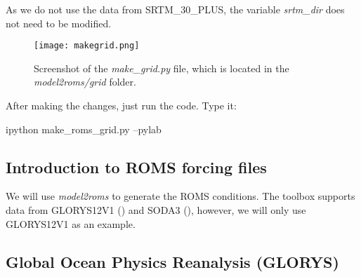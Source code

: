 \begin{tcolorbox}[enhanced,
    grow to left by   = 0cm,
    grow to right by  = 0cm,
    enlarge top by    = 0cm,
    enlarge bottom by = 0cm,
    tcbox raise base,
    boxrule           = 1.0pt,
    left              = 18mm,
    colframe          = yellow!50!black,coltext=yellow!25!black,colback=yellow!10!white,
    overlay           = {\begin{tcbclipinterior}\fill[yellow!75!blue!50!white] (frame.south west)
      rectangle node[text=white,font=\sffamily\bfseries\footnotesize,rotate=0] {ATTENTION} ([xshift=18mm]frame.north west);\end{tcbclipinterior}}]
As we do not use the data from SRTM\_30\_PLUS, the variable \textit{srtm\_dir} does not need to be modified.
\end{tcolorbox}
\bigskip

\begin{figure}[H]
    \centering
    \texttt{[image: makegrid.png]}
    \caption{Screenshot of the \textit{make\_grid.py} file, which is located in the \textit{model2roms/grid} folder.}
    \label{fazgrade}
\end{figure}
\bigskip

\noindent After making the changes, just run the code. Type it:
\bigskip

\begin{bashcode}
ipython make_roms_grid.py --pylab
\end{bashcode}
\bigskip

\subsection{Introduction to ROMS forcing files}
\bigskip

\noindent We will use \textit{model2roms} to generate the ROMS conditions. The toolbox supports data from GLORYS12V1 (\cite{Fernandez2018}) 
and SODA3 (\cite{Carton2018}), however, we will only use GLORYS12V1 as an example.

\subsection{Global Ocean Physics Reanalysis (GLORYS)}
\bigskip

